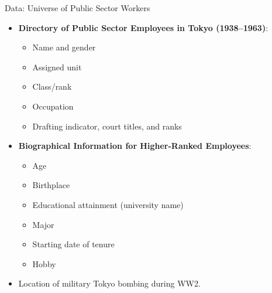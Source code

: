 \begin{frame}{Data: Universe of Public Sector Workers}
\small
\begin{itemize}
    \item \textbf{Directory of Public Sector Employees in Tokyo (1938–1963)}:
    \begin{itemize}
        \item Name and gender
        \item Assigned unit
        \item Class/rank
        \item Occupation
        \item Drafting indicator, court titles, and ranks
    \end{itemize}

    \item \textbf{Biographical Information for Higher-Ranked Employees}:
    \begin{itemize}
        \item Age
        \item Birthplace
        \item Educational attainment (university name)
        \item Major
        \item Starting date of tenure
        \item Hobby
    \end{itemize}

    \item Location of military Tokyo bombing during WW2.
\end{itemize}
\end{frame}
